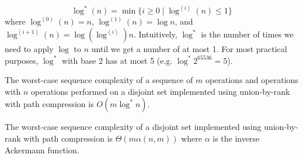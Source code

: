 \begin{definition}
    $$
    \log^*(n) = \min \{ i \geq 0 \mid \log^{(i)} (n) \leq 1 \}
    $$
    where $\log^{(0)}(n) = n$, $\log^{(1)}(n) = \log n$, and $\log^{(i+1)}(n) = \log(\log^{(i)})n$. Intuitively, $\log^*$ is the number of times we need to apply $\log$ to $n$ until we get a number of at most 1. For most practical purposes, $\log^*$ with base 2 has at most 5 (e.g. $\log^* 2^{65536} = 5$).
\end{definition}

\begin{theorem}
    The worst-case sequence complexity of a sequence of $m$  operations and  operations with $n$  operations performed on a disjoint set implemented using union-by-rank with path compression is $O(m \log^* n)$. 
\end{theorem}

\begin{theorem}
    The worst-case sequence complexity of a disjoint set implemented using union-by-rank with path compression is $\Theta(m\alpha(n,m))$ where $\alpha$ is the inverse Ackermann function.
\end{theorem}